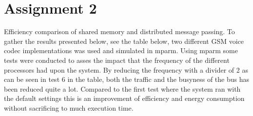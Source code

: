 \section{Assignment 2}
Efficiency comparison of shared memory and distributed message passing.  To gather the results presented below, see the table below, two different GSM voice codec implementations was used and simulated in mparm. Using mparm some tests were conducted to asses the impact that the frequency of the different processors had upon the system.  By reducing the frequency with a divider of 2 as can be seen in test 6 in the table, both the traffic and the busyness of the bus has been reduced quite a lot.  Compared to the first test where the system ran with the default settings this is an improvement of efficiency and energy consumption without sacrificing to much execution time.


